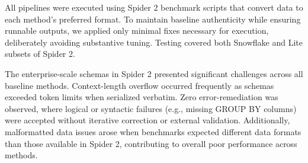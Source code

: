 \documentclass{article} %
\begin{document}
All pipelines were executed using Spider 2 benchmark scripts \citep{lei2024spider} that convert data to each method's preferred format. To maintain baseline authenticity while ensuring runnable outputs, we applied only minimal fixes necessary for execution, deliberately avoiding substantive tuning. Testing covered both Snowflake and Lite subsets of Spider 2.

The enterprise-scale schemas in Spider 2 presented significant challenges across all baseline methods. {Context-length overflow} occurred frequently as schemas exceeded token limits when serialized verbatim. {Zero error-remediation} was observed, where logical or syntactic failures (e.g., missing GROUP BY columns) were accepted without iterative correction or external validation. Additionally, {malformatted data} issues arose when benchmarks expected different data formats than those available in Spider 2, contributing to overall poor performance across methods.






\end{document}
